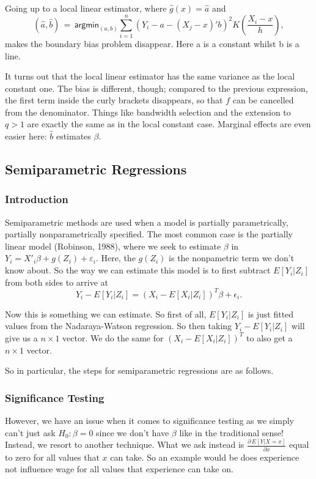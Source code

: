 \documentclass[twoside]{article}
\begin{document}
Going up to a local linear estimator, where $\hat{g}\left(x\right)=\hat{a}$ and \[\left(\hat{a},\hat{b}\right)\,=\,\textsf{argmin}_{\left(a,b\right)}\sum_{i=1}^n\left(Y_i-a-\left(X_j-x\right)'b\right)^2K\left(\frac{X_i-x}{h}\right),\] makes the boundary bias problem disappear. Here a is a constant whilst b is a line.

It turns out that the local linear estimator has the same variance as the local constant one. The bias is different, though; compared to the previous expression, the first term inside the curly brackets disappears, so that $f$ can be cancelled from the denominator. Things like bandwidth selection and the extension to $q>1$ are exactly the same as in the local constant case. Marginal effects are even easier here: $\hat{b}$ estimates $\beta$.

\subsection{Semiparametric Regressions}
\subsubsection{Introduction}
Semiparametric methods are used when a model is partially parametrically, partially nonparametrically specified. The most common case is the partially linear model (Robinson, 1988), where we seek to estimate $\beta$ in $Y_i=X'_i\beta+g\left(Z_i\right)+\varepsilon_i$. Here, the $g(Z_i)$ is the nonpametric term we don't know about. So the way we can estimate this model is to first subtract $E[Y_i|Z_i]$ from both sides to arrive at
$$
Y_i - E[Y_i|Z_i] = (X_i - E[X_i|Z_i])^T\beta + \epsilon_i.
$$

Now this is something we can estimate. So first of all, $E[Y_i|Z_i]$ is just fitted values from the Nadaraya-Watson regression. So then taking $Y_i - E[Y_i|Z_i]$ will give us a $n \times 1$ vector. We do the same for $(X_i - E[X_i|Z_i])^T$ to also get a $n \times 1$ vector. 

So in particular, the steps for semiparametric regressions are as follows.

\subsubsection{Significance Testing}
However, we have an issue when it comes to significance testing as we simply can't just ask $H_0: \beta = 0$ since we don't have $\beta$ like in the traditional sense! Instead, we resort to another technique. What we ask instead is $\frac{\partial\,E\left[Y\left|X=x\right.\right]}{\partial x}$ equal to zero for all values that $x$ can take. So an example would be does experience not influence wage for all values that experience can take on. 
\end{document}

